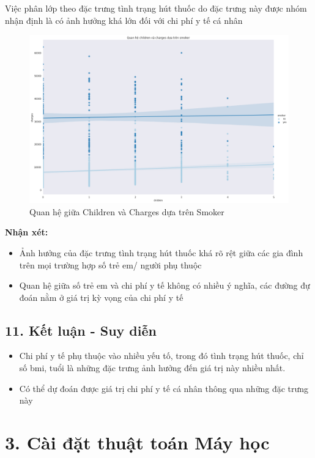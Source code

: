 \documentclass{article}
\begin{document}
	Việc phân lớp theo đặc trưng tình trạng hút thuốc do đặc trưng này được nhóm nhận định là có ảnh hưởng khá lớn đối với chi phí y tế cá nhân
	\begin{figure}[H]
		\centering
		\includegraphics[width=1\textwidth]{images/children_charges_by_smoker.png}
		\caption{Quan hệ giữa Children và Charges dựa trên Smoker}
		\label{fig:writing-thesis-linear-model-medical-charges-children-group-smoker}
	\end{figure}
	\textbf{Nhận xét:} 
	\begin{itemize}
		\item Ảnh hưởng của đặc trưng tình trạng hút thuốc khá rõ rệt giữa các gia đình trên mọi trường hợp số trẻ em/ người phụ thuộc
		\item Quan hệ giữa số trẻ em và chi phí y tế không có nhiều ý nghĩa, các đường đự đoán nằm ở giá trị kỳ vọng của chi phí y tế
	\end{itemize}

	\subsection{11. Kết luận - Suy diễn}
	\begin{itemize}
		\item Chi phí y tế phụ thuộc vào nhiều yếu tố, trong đó tình trạng hút thuốc, chỉ số bmi, tuổi là những đặc trưng ảnh hưởng đến giá trị này nhiều nhất.
		\item Có thể dự đoán được giá trị chi phí y tế cá nhân thông qua những đặc trưng này
	\end{itemize}
	
	\section{3. Cài đặt thuật toán Máy học}
	
\end{document}
